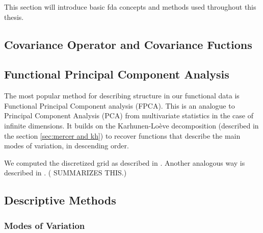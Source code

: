 This section will introduce basic fda concepts and methods used throughout this thesis.

\subsection{Covariance Operator and Covariance Fuctions}
\label{sec:covs}

\subsection{Functional Principal Component Analysis}
\label{sec:fpca}
The most popular method for describing structure in our functional data is Functional
Principal Component analysis (FPCA). This is an analogue to Principal Component Analysis
(PCA) from multivariate statistics in the case of infinite dimensions. It builds on the
Karhunen-Loève decomposition (described in the section \ref{sec:mercer and kh}) to
recover functions that describe the main modes of variation, in descending order.

We computed the discretized grid as described in \citet[Chapter~8.4.1]{RamsaySilverman2005}. Another analogous way
is described in \textcite{KneipUtikal2001}. (\textcite{Delicado2011} SUMMARIZES THIS.)

\subsection{Descriptive Methods}
\label{sec:fpca_descriptives}

\subsubsection{Modes of Variation}
\label{sec:modes_of_variation}